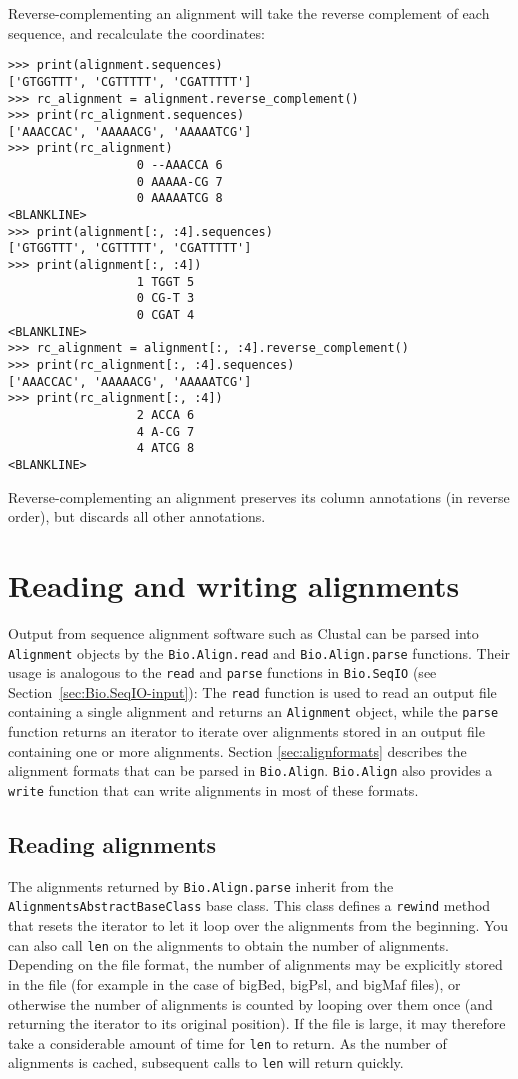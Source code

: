 Reverse-complementing an alignment will take the reverse complement of each sequence, and recalculate the coordinates:
\begin{verbatim}
>>> print(alignment.sequences)
['GTGGTTT', 'CGTTTTT', 'CGATTTTT']
>>> rc_alignment = alignment.reverse_complement()
>>> print(rc_alignment.sequences)
['AAACCAC', 'AAAAACG', 'AAAAATCG']
>>> print(rc_alignment)
                  0 --AAACCA 6
                  0 AAAAA-CG 7
                  0 AAAAATCG 8
<BLANKLINE>
>>> print(alignment[:, :4].sequences)
['GTGGTTT', 'CGTTTTT', 'CGATTTTT']
>>> print(alignment[:, :4])
                  1 TGGT 5
                  0 CG-T 3
                  0 CGAT 4
<BLANKLINE>
>>> rc_alignment = alignment[:, :4].reverse_complement()
>>> print(rc_alignment[:, :4].sequences)
['AAACCAC', 'AAAAACG', 'AAAAATCG']
>>> print(rc_alignment[:, :4])
                  2 ACCA 6
                  4 A-CG 7
                  4 ATCG 8
<BLANKLINE>
\end{verbatim}
Reverse-complementing an alignment preserves its column annotations (in reverse order), but discards all other annotations.

\section{Reading and writing alignments}
\label{sec:alignmentparsers}

Output from sequence alignment software such as Clustal can be parsed into \verb|Alignment| objects by the \verb|Bio.Align.read| and \verb|Bio.Align.parse| functions. Their usage is analogous to the \verb|read| and \verb|parse| functions in \verb|Bio.SeqIO| (see Section~\ref{sec:Bio.SeqIO-input}): The \verb|read| function is used to read an output file containing a single alignment and returns an \verb|Alignment| object, while the \verb|parse| function returns an iterator to iterate over alignments stored in an output file containing one or more alignments. Section \ref{sec:alignformats} describes  the alignment formats that can be parsed in \verb|Bio.Align|.  \verb|Bio.Align| also provides a \verb|write| function that can write alignments in most of these formats.

\subsection{Reading alignments}

The alignments returned by \verb|Bio.Align.parse| inherit from the \verb|AlignmentsAbstractBaseClass| base class. This class defines a \verb|rewind| method that resets the iterator to let it loop over the alignments from the beginning. You can also call \verb|len| on the alignments to obtain the number of alignments. Depending on the file format, the number of alignments may be explicitly stored in the file (for example in the case of bigBed, bigPsl, and bigMaf files), or otherwise the number of alignments is counted by looping over them once (and returning the iterator to its original position). If the file is large, it may therefore take a considerable amount of time for \verb|len| to return. As the number of alignments is cached, subsequent calls to \verb|len| will return quickly.

